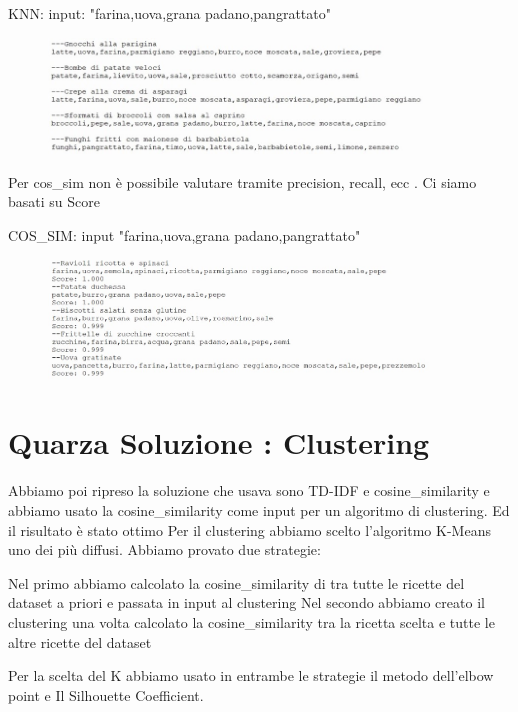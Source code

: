 \documentclass[12pt]{report}
\begin{document}
KNN: input: "farina,uova,grana padano,pangrattato"

\begin{figure}[H]
        \centering
        {\includegraphics[width=0.9\textwidth]{img/img18.jpg}}
\end{figure}

Per cos\_sim non è possibile valutare tramite precision, recall, ecc . Ci siamo basati su Score

COS\_SIM: input "farina,uova,grana padano,pangrattato"

\begin{figure}[H]
        \centering
        {\includegraphics[width=0.9\textwidth]{img/img19.jpg}}
\end{figure}

\chapter{Quarza Soluzione : Clustering}

Abbiamo poi ripreso la soluzione che usava sono TD-IDF e cosine\_similarity e abbiamo usato la cosine\_similarity come input per un algoritmo di clustering. Ed il risultato è stato ottimo
Per il clustering abbiamo scelto l’algoritmo K-Means uno dei più diffusi.
Abbiamo provato due strategie: 

Nel primo abbiamo calcolato la cosine\_similarity di tra tutte le ricette del dataset a priori e passata in input al clustering
Nel secondo abbiamo creato il clustering una volta calcolato la cosine\_similarity tra la ricetta scelta e tutte le altre ricette del dataset

Per la scelta del K abbiamo usato in entrambe le strategie il metodo dell’elbow point e Il Silhouette Coefficient.
\end{document}
